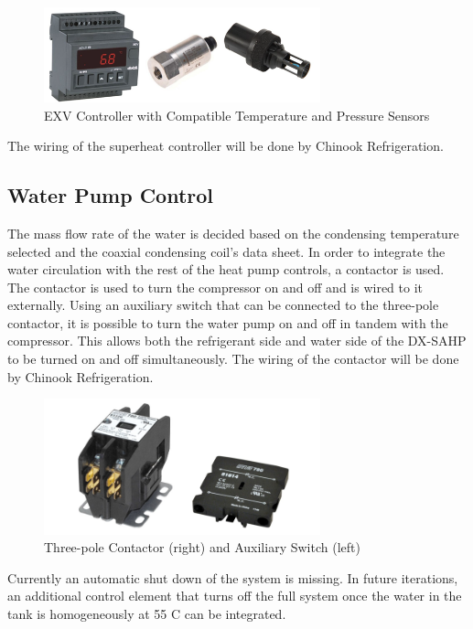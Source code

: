 \begin{figure}[H]
    \centering
    \includegraphics[width=8cm]{images/control_sensors.png}
    \caption{EXV Controller with Compatible Temperature and Pressure Sensors}
\end{figure}

\medskip
The wiring of the superheat controller will be done by Chinook Refrigeration.

\subsection{Water Pump Control}

The mass flow rate of the water is decided based on the condensing temperature selected and the coaxial condensing coil’s data sheet. In order to integrate the water circulation with the rest of the heat pump controls, a contactor is used. The contactor is used to turn the compressor on and off and is wired to it externally. Using an auxiliary switch that can be connected to the three-pole contactor, it is possible to turn the water pump on and off in tandem with the compressor. This allows both the refrigerant side and water side of the DX-SAHP to be turned on and off simultaneously. The wiring of the contactor will be done by Chinook Refrigeration.

\begin{figure}[H]
    \centering
    \includegraphics[width=8cm]{images/water_control.PNG}
    \caption{Three-pole Contactor (right) and Auxiliary Switch (left)}
\end{figure}

\medskip
Currently an automatic shut down of the system is missing. In future iterations, an additional control element that turns off the full system once the water in the tank is homogeneously at 55 \textdegree C can be integrated.